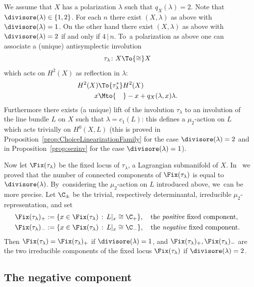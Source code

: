 We assume that $X$ has a polarization $\lambda$ such that $q_X(\lambda)=2$. Note that $\divisore(\lambda)\in\{1,2\}$. For each $n$ there exist $(X,\lambda)$ as above with
$\divisore(\lambda)=1$. On the other hand there exist $(X,\lambda)$ as above with
$\divisore(\lambda)=2$ if and only if
$4\,|\,n$. To~a polarization as above one can associate a (unique) antisymplectic involution
\[
\tau_{\lambda}\colon X\To{\cong}X
\]
which acts on $H^2(X)$ as reflection in $\lambda$:
\begin{equation}\label{riflessione}
\begin{aligned}
H^2(X) & \To{\tau^{*}_{\lambda}}  H^2(X) \\
x & \Mto{\hphantom{\tau^{*}_{\lambda}}}  -x+q_X(\lambda,x)\lambda.
\end{aligned}
\end{equation}
Furthermore there exists (a unique) lift of the involution $\tau_{\lambda}$ to an involution of the line bundle $L$ on $X$ such that $\lambda=c_1(L)$: this
defines a $\mu_2$-action on $L$ which acts trivially on $H^0(X,L)$ (this is proved in Proposition~\ref{prop:ChoiceLinearizationFamily} for the case $\divisore(\lambda)=2$ and in Proposition~\ref{prop:sezinv} for the case $\divisore(\lambda)=1$).

Now let $\Fix(\tau_{\lambda})$ be the fixed locus of $\tau_{\lambda}$, a Lagrangian submanifold of $X$.
In~\cite{involutions1} we proved that the number of connected components of $\Fix(\tau_{\lambda})$ is equal to $\divisore(\lambda)$. By~considering the $\mu_2$-action on $L$ introduced above, we~can be more precise.
Let $\C_{\pm}$ be the trivial, respectively determinantal, irreducible $\mu_2$-representation, and set
\begin{equation*}\label{eq:SigmaPM}
\begin{split}
&\Fix(\tau_{\lambda})_+ :=\{ x\in \Fix(\tau_\lambda) \,:\, L\vert_x \cong \C_+\},\quad \text{the \emph{positive} fixed component},\\
&\Fix(\tau_{\lambda})_- :=\{ x\in \Fix(\tau_\lambda) \,:\, L\vert_x \cong \C_-\},\quad \text{the \emph{negative} fixed component}.
\end{split}
\end{equation*}
Then $\Fix(\tau_{\lambda})=\Fix(\tau_{\lambda})_+$ if $\divisore(\lambda)=1$, and $\Fix(\tau_{\lambda})_+,\Fix(\tau_{\lambda})_-$ are the two irreducible components of the fixed locus $\Fix(\tau_{\lambda})$ if $\divisore(\lambda)=2$.

\subsection{The negative component}\label{subsec:Fano}

